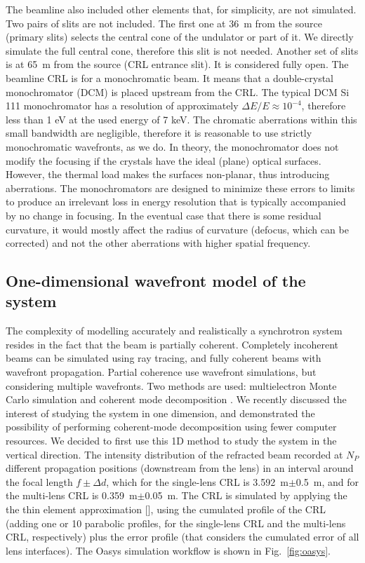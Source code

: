 \documentclass[preprint]{iucr}
\newcommand{\inred}[1]{{\color{red}#1}}
\begin{document}
 \inred{The beamline also included other elements that, for simplicity, are not simulated. Two pairs of slits are not included. The first one at \SI{36}{\meter} from the source (primary slits) selects the central cone of the undulator or part of it. We directly simulate the full central cone, therefore this slit is not needed. Another set of slits is at \SI{65}{\meter} from the source (CRL entrance slit). It is considered fully open.
 The beamline CRL is for a monochromatic beam. It means that a double-crystal monochromator (DCM) is placed upstream from the CRL.
 The typical DCM Si 111 monochromator has a resolution of approximately $\Delta E/E \approx 10^{-4}$, therefore less than 1 eV at the used energy of 7 keV. The chromatic aberrations within this small bandwidth are negligible, therefore it is reasonable to use strictly monochromatic wavefronts, as we do. In theory, the monochromator does not modify the focusing if the crystals have the ideal (plane) optical surfaces. However, the thermal load makes the surfaces non-planar, thus introducing aberrations. The monochromators are designed to minimize these errors to limits to produce an irrelevant loss in energy resolution that is typically accompanied by no change in focusing. In the eventual case that there is some residual curvature, it would mostly affect the radius of curvature (defocus, which can be corrected) and not the other aberrations with higher spatial frequency.
 }

\subsection{One-dimensional wavefront model of the system}\label{sec:descriptionsystem}
The complexity of modelling accurately and realistically a synchrotron system resides in the fact that the beam is partially coherent. Completely incoherent beams can be simulated using ray tracing, and fully coherent beams with wavefront propagation. Partial coherence use wavefront simulations, but considering multiple wavefronts. Two methods are used: multielectron Monte Carlo simulation \cite{codeSRW_ME} and coherent mode decomposition \cite{Glass2017}. We recently discussed the interest of studying the system in one dimension, and demonstrated the possibility of performing coherent-mode decomposition \cite{multioptics}  using fewer computer resources. We decided to first use this 1D method to study the system in the vertical direction. 
The intensity distribution of the refracted beam recorded at $N_P$ different propagation positions (downstream from the lens) in an interval around the focal length $f\pm\Delta d$, which for the single-lens CRL is \SI{3.592}{\meter}$\pm$\SI{0.5}{\meter}, and for the multi-lens CRL is \SI{0.359}{\meter}$\pm$\SI{0.05}{\meter}.
The CRL is simulated by applying the the thin element approximation \inred{[\cite{Celestre2020, multioptics}]}, using the cumulated profile of the CRL (adding one or 10 parabolic profiles, for the single-lens CRL and the multi-lens CRL, respectively) plus the error profile (that considers the cumulated error of all lens interfaces).
The Oasys \cite{codeOASYS} simulation workflow is shown in Fig.~\ref{fig:oasys}. 
\end{document}
